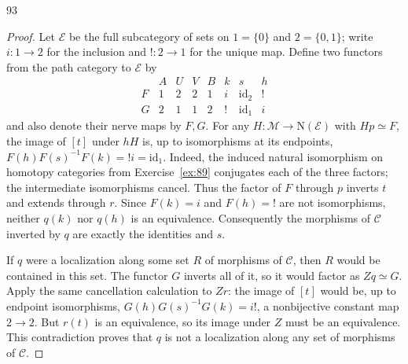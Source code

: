 \begin{exercise}{93}
\begin{proof}
Let $\mathcal E$ be the full subcategory of sets on
$1=\{0\}$ and $2=\{0,1\}$; write $i\colon1\to2$ for the inclusion
and $!\colon2\to1$ for the unique map.
Define two functors from the path category to $\mathcal E$ by
\[
 \begin{array}{c|cccc|ccc}
       & A & U & V & B & k & s & h \\
 F     & 1 & 2 & 2 & 1 & i & \mathrm{id}_2 & ! \\
 G     & 2 & 1 & 1 & 2 & ! & \mathrm{id}_1 & i
 \end{array}
\]
and also denote their nerve maps by $F,G$.
For any $H\colon\mathcal M\to\mathrm N(\mathcal E)$ with
$Hp\simeq F$, the image of $[t]$ under $hH$ is, up to isomorphisms
at its endpoints,
$F(h)F(s)^{-1}F(k)=!i=\mathrm{id}_1$.
Indeed, the induced natural isomorphism on homotopy categories from
Exercise~\ref{ex:89} conjugates each of the three factors;
the intermediate isomorphisms cancel.
Thus the factor of $F$ through $p$ inverts $t$ and extends through $r$.
Since $F(k)=i$ and $F(h)=!$ are not isomorphisms, neither $q(k)$ nor
$q(h)$ is an equivalence.
Consequently the morphisms of $\mathcal C$ inverted by $q$ are exactly
the identities and $s$.

If $q$ were a localization along some set $R$ of morphisms of $\mathcal C$,
then $R$ would be contained in this set.
The functor $G$ inverts all of it, so it would factor as $Zq\simeq G$.
Apply the same cancellation calculation to $Zr$:
the image of $[t]$ would be, up to endpoint isomorphisms,
$G(h)G(s)^{-1}G(k)=i!$, a nonbijective constant map $2\to2$.
But $r(t)$ is an equivalence, so its image under $Z$ must be an
equivalence. This contradiction proves that $q$ is not a localization
along any set of morphisms of $\mathcal C$.
\end{proof}
\end{exercise}
